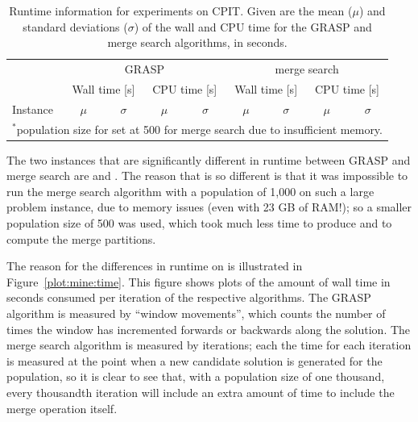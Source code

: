 \documentclass[preprint]{elsarticle}
\begin{document}
\begin{table}[h!]
\centering
\caption[Runtime information for experiments on CPIT]{Runtime information for experiments on CPIT. Given are the mean (\(\mu\)) and standard deviations (\(\sigma\)) of the wall and CPU time for the GRASP and merge search algorithms, in seconds.}\label{tab:mine:runtime}
\begin{adjustbox}{width=0.95\textwidth}
\begin{tabular}{lrrrrrrrr} \toprule
 & \multicolumn{4}{c}{GRASP} & \multicolumn{4}{c}{merge search}\\
\cmidrule(lr){2-5} \cmidrule(lr){6-9}
 & \multicolumn{2}{c}{Wall time [s]} & \multicolumn{2}{c}{CPU time [s]} & \multicolumn{2}{c}{Wall time [s]} & \multicolumn{2}{c}{CPU time [s]}\\
\cmidrule(lr){2-3}\cmidrule(lr){4-5} \cmidrule(lr){6-7}\cmidrule(lr){8-9}
Instance & \multicolumn{1}{c}{\(\mu\)}&\multicolumn{1}{c}{\(\sigma\)} & \multicolumn{1}{c}{\(\mu\)}& \multicolumn{1}{c}{\(\sigma\)}& \multicolumn{1}{c}{\(\mu\)}&\multicolumn{1}{c}{\(\sigma\)} & \multicolumn{1}{c}{\(\mu\)}& \multicolumn{1}{c}{\(\sigma\)}\\ \midrule



\bottomrule
\multicolumn{9}{l}{\(^*\)population size for \zucklarge{} set at 500 for merge search due to insufficient memory.}
\end{tabular}
\end{adjustbox}
\end{table}
%

The two instances that are significantly different in runtime between GRASP and merge search are \dmine{} and \zucklarge{}. The reason that \zucklarge{} is so different is that it was impossible to run the merge search algorithm with a population of 1,000 on such a large problem instance, due to memory issues (even with 23 GB of RAM!); so a smaller population size of 500 was used, which took much less time to produce and to compute the merge partitions.

The reason for the differences in runtime on \dmine{} is illustrated in Figure~\ref{plot:mine:time}.
This figure shows plots of the amount of wall time in seconds consumed per iteration of the respective algorithms. The GRASP algorithm is measured by ``window movements'', which counts the number of times the window has incremented forwards or backwards along the solution. The merge search algorithm is measured by iterations; each the time for each iteration is measured at the point when a new candidate solution is generated for the population, so it is clear to see that, with a population size of one thousand, every thousandth iteration will include an extra amount of time to include the merge operation itself. 
\end{document}
